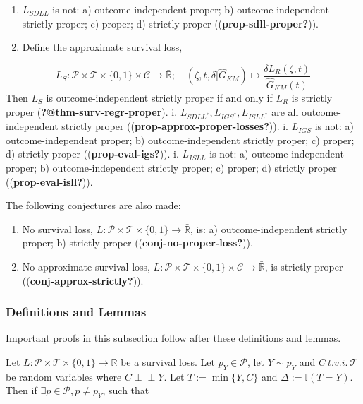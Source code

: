 \documentclass[
  letterpaper,
]{scrbook}
\providecommand{\tightlist}{%
  \setlength{\itemsep}{0pt}\setlength{\parskip}{0pt}}\usepackage{longtable,booktabs,array}
\theoremstyle{plain}
\theoremstyle{definition}
\theoremstyle{remark}
\begin{document}
\begin{enumerate}
\def\labelenumi{\roman{enumi}.}
\tightlist
\item
  \(L_{SDLL}\) is not: a) outcome-independent proper; b)
  outcome-independent strictly proper; c) proper; d) strictly proper
  ((\textbf{prop-sdll-proper?})).
\item
  Define the approximate survival loss,
\end{enumerate}

\[
L_S: \mathcal{P}\times \mathcal{T}\times \{0,1\}\times \mathcal{C}\rightarrow \bar{\mathbb{R}}; \quad
(\zeta, t, \delta|\hat{G}_{KM}) \mapsto \frac{\delta L_R(\zeta, t)}{\hat{G}_{KM}(t)}
\] Then \(L_S\) is outcome-independent strictly proper if and only if
\(L_R\) is strictly proper (\textbf{?@thm-surv-regr-proper}). i.
\(L_{SDLL^*}, L_{IGS^*}, L_{ISLL^*}\) are all outcome-independent
strictly proper ((\textbf{prop-approx-proper-losses?})). i. \(L_{IGS}\)
is not: a) outcome-independent proper; b) outcome-independent strictly
proper; c) proper; d) strictly proper ((\textbf{prop-eval-igs?})). i.
\(L_{ISLL}\) is not: a) outcome-independent proper; b)
outcome-independent strictly proper; c) proper; d) strictly proper
((\textbf{prop-eval-isll?})).

The following conjectures are also made:

\begin{enumerate}
\def\labelenumi{\roman{enumi}.}
\tightlist
\item
  No survival loss,
  \(L: \mathcal{P}\times \mathcal{T}\times \{0,1\}\rightarrow \bar{\mathbb{R}}\),
  is: a) outcome-independent strictly proper; b) strictly proper
  ((\textbf{conj-no-proper-loss?})).
\item
  No approximate survival loss,
  \(L: \mathcal{P}\times \mathcal{T}\times \{0,1\}\times \mathcal{C}\rightarrow \bar{\mathbb{R}}\),
  is strictly proper ((\textbf{conj-approx-strictly?})).
\end{enumerate}

\hypertarget{definitions-and-lemmas}{%
\subsubsection{Definitions and Lemmas}\label{definitions-and-lemmas}}

Important proofs in this subsection follow after these definitions and
lemmas.

\leavevmode{}%
\label{lem:proper_relate} Let
\(L: \mathcal{P}\times \mathcal{T}\times \{0,1\}\rightarrow \bar{\mathbb{R}}\)
be a survival loss. Let \(p_Y \in \mathcal{P}\), let \(Y \sim p_Y\) and
\(C \ t.v.i. \ \mathcal{T}\) be random variables where
\(C \perp \!\!\! \perp Y\). Let \(T := \min\{Y,C\}\) and
\(\Delta := \mathbb{I}(T=Y)\). Then if
\(\exists p \in \mathcal{P}, p \neq p_Y\), such that
\end{document}
